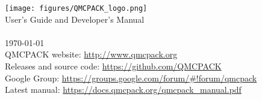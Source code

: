 
\begin{titlepage}
\vspace*{\fill}
\begin{center}

\texttt{[image: figures/QMCPACK\_logo.png]} \\
{\huge User's Guide and Developer's Manual\\}
{\huge \QMCPACKver \\}
{\huge %
\today}\\
\vspace{2.5cm}
{\small QMCPACK website: \url{http://www.qmcpack.org}}\\
{\small Releases and source code:  \url{https://github.com/QMCPACK}}\\
{\small Google Group: \url{https://groups.google.com/forum/#!forum/qmcpack}}\\
{\small Latest manual: \url{https://docs.qmcpack.org/qmcpack_manual.pdf}}
\end{center}
\vspace*{\fill}
\end{titlepage}
